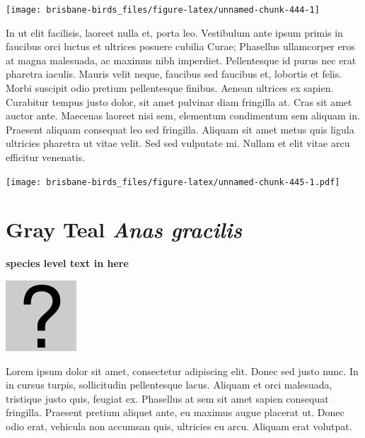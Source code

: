 \documentclass[]{book}
\let\origfigure\figure
\let\endorigfigure\endfigure
\renewenvironment{figure}[1][2] {
  \expandafter\origfigure\expandafter[H]
} {
  \endorigfigure
}
\begin{document}
\begin{figure}
\texttt{[image: brisbane-birds\_files/figure-latex/unnamed-chunk-444-1]} \caption{insert figure caption}\label{fig:unnamed-chunk-444}
\end{figure}

In ut elit facilisis, laoreet nulla et, porta leo. Vestibulum ante ipsum
primis in faucibus orci luctus et ultrices posuere cubilia Curae;
Phasellus ullamcorper eros at magna malesuada, ac maximus nibh
imperdiet. Pellentesque id purus nec erat pharetra iaculis. Mauris velit
neque, faucibus sed faucibus et, lobortis et felis. Morbi suscipit odio
pretium pellentesque finibus. Aenean ultrices ex sapien. Curabitur
tempus justo dolor, sit amet pulvinar diam fringilla at. Cras sit amet
auctor ante. Maecenas laoreet nisi sem, elementum condimentum sem
aliquam in. Praesent aliquam consequat leo sed fringilla. Aliquam sit
amet metus quis ligula ultricies pharetra ut vitae velit. Sed sed
vulputate mi. Nullam et elit vitae arcu efficitur venenatis.

\begin{figure}
\centering
\texttt{[image: brisbane-birds\_files/figure-latex/unnamed-chunk-445-1.pdf]}
\caption{\label{fig:unnamed-chunk-445}insert figure caption}
\end{figure}

\section{\texorpdfstring{Gray Teal \emph{Anas
gracilis}}{Gray Teal Anas gracilis}}\label{gray-teal-anas-gracilis}

\textbf{species level text in here}

\begin{figure}
\centering
\includegraphics{assets/missing.png}
\caption{No image for species}
\end{figure}

Lorem ipsum dolor sit amet, consectetur adipiscing elit. Donec sed justo
nunc. In in cursus turpis, sollicitudin pellentesque lacus. Aliquam et
orci malesuada, tristique justo quis, feugiat ex. Phasellus at sem sit
amet sapien consequat fringilla. Praesent pretium aliquet ante, eu
maximus augue placerat ut. Donec odio erat, vehicula non accumsan quis,
ultricies eu arcu. Aliquam erat volutpat.
\end{document}
